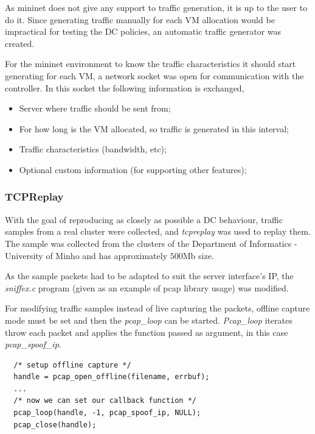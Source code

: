 \documentclass[12pt,english,oneside]{book}
\begin{document}
As mininet does not give any support to traffic generation, it is up to the user to do it. Since generating traffic manually for each VM allocation would be impractical for testing the DC policies, an automatic traffic generator was created.

For the mininet environment to know the traffic characteristics it should start generating for each VM, a network socket was open for communication with the controller.
In this socket the following information is exchanged,
\begin{itemize}
  \item Server where traffic should be sent from;
  \item For how long is the VM allocated, so traffic is generated in this interval;
  \item Traffic characteristics (bandwidth, etc);
  \item Optional custom information (for supporting other features);
\end{itemize}

\subsubsection{TCPReplay}
\hspace{0.6cm}

With the goal of reproducing as closely as possible a DC behaviour, traffic samples from a real cluster were collected, and \textit{tcpreplay}\cite{tcprep} was used to replay them. The sample was collected from the clusters of the Department of Informatics - University of Minho and has approximately $500$Mb size.

As the sample packets had to be adapted to suit the server interface's IP, the \textit{sniffex.c}\cite{sniffex} program (given as an example of pcap library usage) was modified.

For modifying traffic samples instead of live capturing the packets, offline capture mode must be set and then the \textit{pcap\_loop} can be started. \textit{Pcap\_loop} iterates throw each packet and applies the function passed as argument, in this case \textit{pcap\_spoof\_ip}.

\lstset{language=C,frame=lines}
\begin{lstlisting}
  /* setup offline capture */
  handle = pcap_open_offline(filename, errbuf);
  ...
  /* now we can set our callback function */
  pcap_loop(handle, -1, pcap_spoof_ip, NULL);
  pcap_close(handle);
\end{lstlisting}
\end{document}

